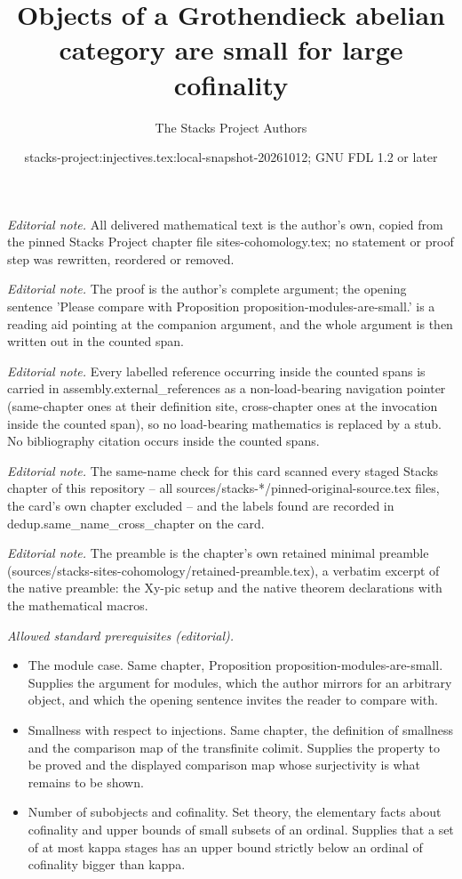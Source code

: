 \documentclass[10pt,a4paper]{amsart}
\title{Objects of a Grothendieck abelian category are small for large cofinality}
\author{The Stacks Project Authors}
\date{stacks-project:injectives.tex:local-snapshot-20261012; GNU FDL 1.2 or later}
\theoremstyle{plain}
\theoremstyle{definition}
\theoremstyle{remark}
\numberwithin{equation}{subsection}
\begin{document}
\maketitle
\noindent\textit{Editorial note.} All delivered mathematical text is the author's own, copied from the pinned Stacks Project chapter file sites-cohomology.tex; no statement or proof step was rewritten, reordered or removed.\par\medskip
\noindent\textit{Editorial note.} The proof is the author's complete argument; the opening sentence 'Please compare with Proposition proposition-modules-are-small.' is a reading aid pointing at the companion argument, and the whole argument is then written out in the counted span.\par\medskip
\noindent\textit{Editorial note.} Every labelled reference occurring inside the counted spans is carried in assembly.external\_references as a non-load-bearing navigation pointer (same-chapter ones at their definition site, cross-chapter ones at the invocation inside the counted span), so no load-bearing mathematics is replaced by a stub. No bibliography citation occurs inside the counted spans.\par\medskip
\noindent\textit{Editorial note.} The same-name check for this card scanned every staged Stacks chapter of this repository -- all sources/stacks-*/pinned-original-source.tex files, the card's own chapter excluded -- and the labels found are recorded in dedup.same\_name\_cross\_chapter on the card.\par\medskip
\noindent\textit{Editorial note.} The preamble is the chapter's own retained minimal preamble (sources/stacks-sites-cohomology/retained-preamble.tex), a verbatim excerpt of the native preamble: the Xy-pic setup and the native theorem declarations with the mathematical macros.\par\medskip
\noindent\textit{Allowed standard prerequisites (editorial).}\begin{itemize}
\item The module case. Same chapter, Proposition proposition-modules-are-small. Supplies the argument for modules, which the author mirrors for an arbitrary object, and which the opening sentence invites the reader to compare with.
\item Smallness with respect to injections. Same chapter, the definition of smallness and the comparison map of the transfinite colimit. Supplies the property to be proved and the displayed comparison map whose surjectivity is what remains to be shown.
\item Number of subobjects and cofinality. Set theory, the elementary facts about cofinality and upper bounds of small subsets of an ordinal. Supplies that a set of at most kappa stages has an upper bound strictly below an ordinal of cofinality bigger than kappa.
\end{itemize}\medskip
\end{document}
